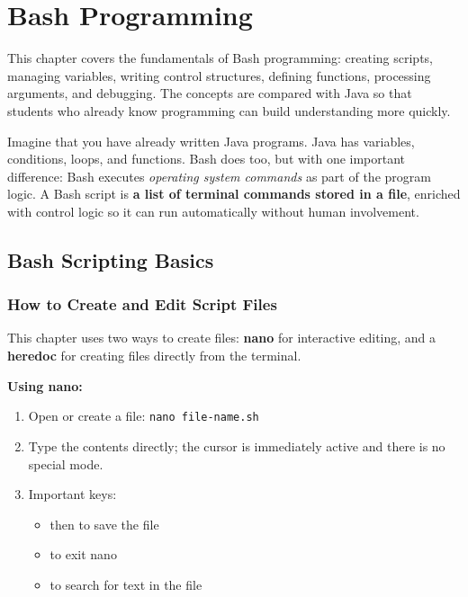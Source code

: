 
\chapter{Bash Programming}
\label{ch:bash-programming}

This chapter covers the fundamentals of Bash programming: creating scripts,
managing variables, writing control structures, defining functions,
processing arguments, and debugging. The concepts are compared with Java so
that students who already know programming can build understanding more
quickly.

\begin{examplebox}
Imagine that you have already written Java programs. Java has variables,
conditions, loops, and functions. Bash does too, but with one important
difference: Bash executes \textit{operating system commands} as part of the
program logic. A Bash script is \textbf{a list of terminal commands stored in
a file}, enriched with control logic so it can run automatically without
human involvement.
\end{examplebox}

\section{Bash Scripting Basics}
\label{sec:creating-scripts}

\subsection*{How to Create and Edit Script Files}

This chapter uses two ways to create files: \textbf{nano} for interactive
editing, and a \textbf{heredoc} for creating files directly from the
terminal.

\textbf{Using nano:}
\begin{enumerate}
  \item Open or create a file: \texttt{nano file-name.sh}
  \item Type the contents directly; the cursor is immediately active and
    there is no special mode.
  \item Important keys:
  \begin{itemize}
    \item {} then  to save the file
    \item {} to exit nano
    \item {} to search for text in the file
  \end{itemize}
\end{enumerate}

